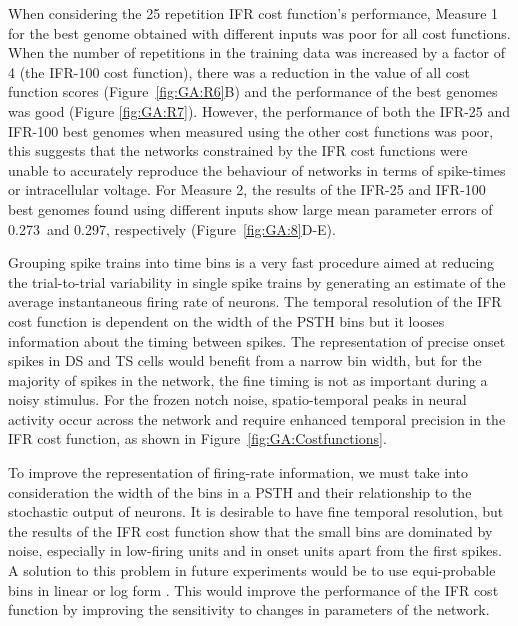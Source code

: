  When considering the 25
repetition IFR cost function's performance, Measure 1 for the best genome
obtained with different inputs was poor for all cost functions. When the number
of repetitions in the training data was increased by a factor of 4 (the IFR-100
cost function), there was a reduction in the value of all cost function scores
(Figure~\ref{fig:GA:R6}B) and the performance of the best genomes was good (Figure
\ref{fig:GA:R7}). However, the performance of both the IFR-25 and IFR-100 best
genomes when measured using the other cost functions was poor, this suggests
that the networks constrained by the IFR cost functions were unable to
accurately reproduce the behaviour of networks in terms of spike-times or
intracellular voltage. %
For Measure 2, the results of the IFR-25 and IFR-100 best genomes found using
different inputs show large mean parameter errors of 0.273~and 0.297,
respectively (Figure~\ref{fig:GA:8}D-E).

\smallskip{}

Grouping spike trains into time bins is a very fast procedure aimed at reducing
the trial-to-trial variability in single spike trains by generating an estimate
of the average instantaneous firing rate of neurons. The temporal resolution of
the IFR cost function is dependent on the width of the PSTH bins but it looses
information about the timing between spikes.  The representation of precise
onset spikes in DS and TS cells would benefit from a narrow bin width, but for
the majority of spikes in the network, the fine timing is not as important
during a noisy stimulus.  For the frozen notch noise, spatio-temporal peaks in
neural activity occur across the network and require enhanced temporal precision
in the IFR cost function, as shown in Figure~\ref{fig:GA:Costfunctions}.

\smallskip{}

To improve the representation of firing-rate information, we must take into
consideration the width of the bins in a PSTH and their relationship to the
stochastic output of neurons.  It is desirable to have fine temporal resolution,
but the results of the IFR cost function show that the small bins are dominated
by noise, especially in low-firing units and in onset units apart from the first
spikes. A solution to this problem in future experiments would be to use
equi-probable bins in linear or log form \cite{BhumbraInyushkinEtAl:2004}.  This would improve the
performance of the IFR cost function by improving the sensitivity to changes in
parameters of the network.

